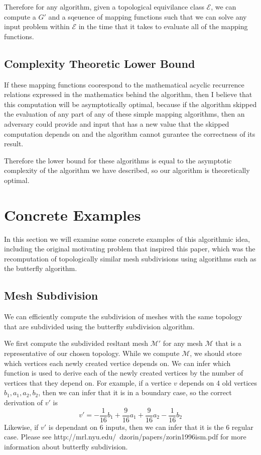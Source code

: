 \documentclass[11pt]{article} %
\begin{document}
Therefore for any algorithm, given a topological equivilance class $\mathcal{E}$, we can compute a $G'$ and a sqeuence of mapping functions such that we can solve any input problem within $\mathcal{E}$ in the time that it takes to evaluate all of the mapping functions.

\subsection{Complexity Theoretic Lower Bound}

If these mapping functions coorespond to the mathematical acyclic recurrence relations expressed in the mathematics behind the algorithm, then I believe that this computation will be asymptotically optimal, because if the algorithm skipped the evaluation of any part of any of these simple mapping algorithms, then an adversary could provide and input that has a new value that the skipped computation depends on and the algorithm cannot gurantee the correctness of its result.

Therefore the lower bound for these algorithms is equal to the asymptotic complexity of the algorithm we have described, so our algorithm is theoretically optimal.

\section{Concrete Examples}

In this section we will examine some concrete examples of this algorithmic idea, including the original motivating problem that inspired this paper, which was the recomputation of topologically similar mesh subdivisions using algorithms such as the butterfly algorithm.

\subsection{Mesh Subdivision}

We can efficiently compute the subdivision of meshes with the same topology that are subdivided using the butterfly subdivision algorithm.

We first compute the subdivided resltant mesh $\mathcal{M'}$ for any mesh $\mathcal{M}$ that is a representative of our chosen topology. While we compute $\mathcal{M}$, we should store which vertices each newly created vertice depends on. We can infer which function is used to derive each of the newly created vertices by the number of vertices that they depend on. For example, if a vertice $v$ depends on 4 old vertices $b_{1}, a_{1}, a_{2}, b_{2}$, then we can infer that it is in a boundary case, so the correct derivation of $v'$ is $$v' = -\frac{1}{16}b_{1} + \frac{9}{16}a_{1} + \frac{9}{16}a_{2} - \frac{1}{16}b_{2}$$ Likewise, if $v'$ is dependant on 6 inputs, then we can infer that it is the 6 regular case. Please see http://mrl.nyu.edu/~dzorin/papers/zorin1996ism.pdf for more information about butterfly subdivision.\\
\end{document}
